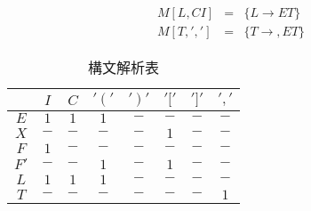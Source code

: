 \documentclass[a4paper,12pt]{jarticle}
\begin{document}
\begin{enumerate}
\begin{eqnarray*}
M [ L ,CI ] & = & \{ L \rightarrow E T \} \\
M [ T , ' , ' ] & = & \{ T \rightarrow , E T \}
\end{eqnarray*}
\begin{table}[H]
 \begin{center}
  \caption{構文解析表}
  \begin{tabular}{|c|ccccccc|}\hline
   \backslashbox{}{}&	$ I $&	$ C $&	$' \left( \right. '$&	$' \left. \right) '$&	$ ' [ ' $&	$ ' ] ' $&	$ ' , ' $\\	\hline
   $ E $&		$ 1 $&	$ 1 $&	$ 1 $&			$ - $&			$ - $&		$ - $&		$ - $\\
   $ X $&		$ - $&	$ - $&	$ - $&			$ - $&			$ 1 $&		$ - $&		$ - $\\
   $ F $&		$ 1 $&	$ - $&	$ - $&			$ - $&			$ - $&		$ - $&		$ - $\\
   $ F' $&		$ - $&	$ - $&	$ 1 $&			$ - $&			$ 1 $&		$ - $&		$ - $\\
   $ L $&		$ 1 $&	$ 1 $&	$ 1 $&			$ - $&			$ - $&		$ - $&		$ - $\\
   $ T $&		$ - $&	$ - $&	$ - $&			$ - $&			$ - $&		$ - $&		$ 1 $\\		\hline
  \end{tabular}
 \end{center}
\end{table}
\end{enumerate}
\end{document}
